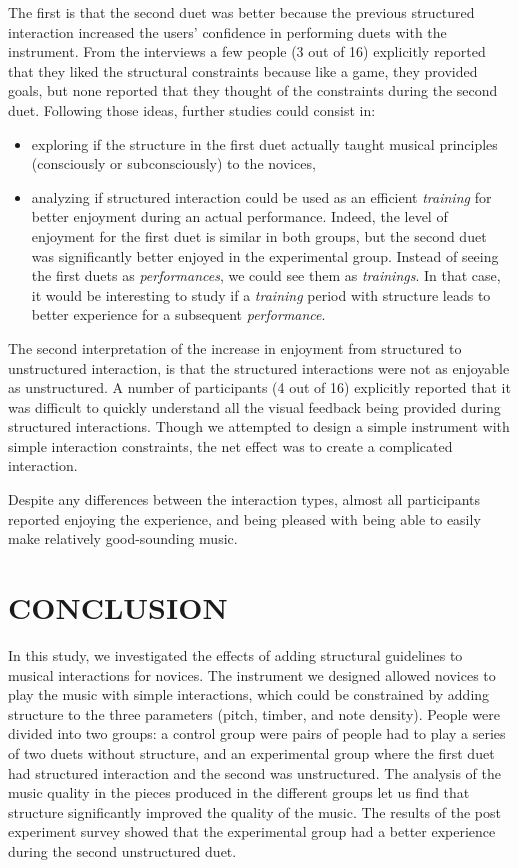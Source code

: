 \documentclass{article}
\begin{document}
The first is that the second duet was better because the previous structured interaction increased the users' confidence in performing duets with the instrument. From the interviews a few people (3 out of 16) explicitly reported that they liked the structural constraints because like a game, they provided goals, but none reported that they thought of the constraints during the second duet. Following those ideas, 
further studies could consist in:
\begin{itemize}
\item exploring if the structure in the first duet actually taught musical principles (consciously or subconsciously) to the novices,
\item analyzing if structured interaction could be used as an efficient \textit{training} for better enjoyment during an actual performance. Indeed, the level of enjoyment for the first duet is similar in both groups, but the second duet was significantly better enjoyed in the experimental group. Instead of seeing the first duets as \textit{performances}, we could see them as \textit{trainings}. In that case, it would be interesting to study if a \textit{training} period with structure leads to better experience for a subsequent \textit{performance}.
\end{itemize}

The second interpretation of the increase in enjoyment from structured to unstructured interaction, is that the structured interactions were not as enjoyable as unstructured.  A number of participants (4 out of 16) explicitly reported that it was difficult to quickly understand all the visual feedback being provided during structured interactions.  Though we attempted to design a simple instrument with simple interaction constraints, the net effect was to create a complicated interaction.

Despite any differences between the interaction types, almost all participants reported enjoying the experience, and being pleased with being able to easily make relatively good-sounding music.




\section{CONCLUSION}

In this study, we investigated the effects of adding structural guidelines to musical interactions for novices. The instrument we designed allowed novices to play the music with simple interactions, which could be constrained by adding structure to the three parameters (pitch, timber, and note density). People were divided into two groups: a control group were pairs of people had to play a series of two duets without structure, and an experimental group where the first duet had structured interaction and the second was unstructured. The analysis of the music quality in the pieces produced in the different groups let us find that structure significantly improved the quality of the music. The results of the post experiment survey showed that the experimental group had a better experience during the second unstructured duet.
\end{document}
